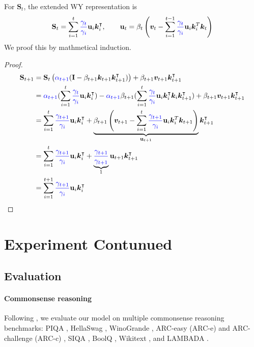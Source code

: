 \documentclass{article}
\def\rmI{{\mathbf{I}}}
\def\rmS{{\mathbf{S}}}
\def\vk{{\bm{k}}}
\def\vu{{\bm{u}}}
\def\vv{{\bm{v}}}
\def\vu{\mathbf{u}}
\begin{document}
For $\rmS_t$, the extended WY representation is 
\begin{align*}
    \rmS_t = \sum_{i=1}^t {\color{blue}\frac{\gamma_{t}}{\gamma_i}} \vu_i \vk_i^\intercal, \qquad \vu_t = \beta_t \left( \vv_t - \sum_{i=1}^{t-1} {\color{blue} \frac{\gamma_{t}}{\gamma_i}} \vu_i \vk_i^T \vk_t \right)
\end{align*}
We proof this by mathmetical induction.
\begin{proof}
\begin{align*}
\centering
\rmS_{t+1} &=\rmS_{t} \left({\color{blue}\alpha_{t+1}} (\rmI - \beta_{t+1} \vk_{t+1}\vk_{t+1}^\intercal) \right) + \beta_{t+1} \vv_{t+1}  \vk_{t+1}^\intercal \\ &= {\color{blue}\alpha_{t+1}} (\sum_{i=1}^t {\color{blue}\frac{\gamma_t}{\gamma_i}} \vu_i \vk_i^\intercal) - {\color{blue}\alpha_{t+1}} \beta_{t+1} (\sum_{i=1}^t {\color{blue}\frac{\gamma_t}{\gamma_i}} \vu_i \vk_i^\intercal \vk_i  \vk_{t+1}^\intercal) + \beta_{t+1} \vv_{t+1} \vk_{t+1}^\intercal \\
&= \sum_{i=1}^t {\color{blue}\frac{\gamma_{t+1}}{\gamma_{i}}} \vu_i \vk_i^\intercal + \underbrace{\beta_{t+1} \left( \vv_{t+1} - \sum_{i=1}^t {\color{blue}\frac{\gamma_{t+1}}{\gamma_{i}}}\vu_i \vk_i^T \vk_{t+1} \right)}_{  \vu_{t+1}} \vk_{t+1}^\intercal \\
&= \sum_{i=1}^t {\color{blue}\frac{\gamma_{t+1}}{\gamma_{i}}} \vu_i \vk_i^\intercal + \underbrace{{\color{blue}\frac{\gamma_{t+1}}{\gamma_{t+1}}}}_{1} \vu_{t+1} \vk_{t+1}^\intercal
\\
&= 
\sum_{i=1}^{t+1} {\color{blue}\frac{\gamma_{t+1}}{\gamma_i}} \vu_i \vk_i^\intercal
\end{align*}
\end{proof}

\section{Experiment Contunued}

\subsection{Evaluation}
\label{sec:evaluation}
\paragraph{Commonsense reasoning} Following \citet{gu_mamba_2023}, we evaluate our model on multiple commonsense reasoning benchmarks: PIQA \citep{bisk2020piqa}, HellaSwag \citep[Hella.;][]{zellers2019hellaswag}, WinoGrande \citep[Wino.;][]{sakaguchi2021winogrande}, ARC-easy (ARC-e) and ARC-challenge (ARC-c) \citep{arc-ce}, SIQA \citep{sap2019social}, BoolQ \citep{clark2019boolq}, Wikitext \citep[Wiki.;][]{merity2016pointer}, and LAMBADA \citep[LMB.;][]{paperno_lambada_2016}.
\end{document}
